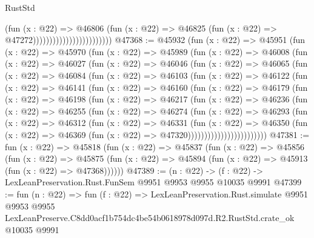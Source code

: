 \begin{lexlean}{RustStd}
\begin{coremodule}
                                              (fun (x : @22) =>
                                              @46806
                                                (fun (x : @22) =>
                                                @46825
                                                  (fun (x : @22) => @47272))))))))))))))))))))))))
@47368 := @45932
    (fun (x : @22) =>
    @45951
      (fun (x : @22) =>
      @45970
        (fun (x : @22) =>
        @45989
          (fun (x : @22) =>
          @46008
            (fun (x : @22) =>
            @46027
              (fun (x : @22) =>
              @46046
                (fun (x : @22) =>
                @46065
                  (fun (x : @22) =>
                  @46084
                    (fun (x : @22) =>
                    @46103
                      (fun (x : @22) =>
                      @46122
                        (fun (x : @22) =>
                        @46141
                          (fun (x : @22) =>
                          @46160
                            (fun (x : @22) =>
                            @46179
                              (fun (x : @22) =>
                              @46198
                                (fun (x : @22) =>
                                @46217
                                  (fun (x : @22) =>
                                  @46236
                                    (fun (x : @22) =>
                                    @46255
                                      (fun (x : @22) =>
                                      @46274
                                        (fun (x : @22) =>
                                        @46293
                                          (fun (x : @22) =>
                                          @46312
                                            (fun (x : @22) =>
                                            @46331
                                              (fun (x : @22) =>
                                              @46350
                                                (fun (x : @22) =>
                                                @46369
                                                  (fun (x : @22) => @47320))))))))))))))))))))))))
@47381 := fun (x : @22) =>
  @45818
    (fun (x : @22) =>
    @45837
      (fun (x : @22) =>
      @45856
        (fun (x : @22) =>
        @45875 (fun (x : @22) => @45894 (fun (x : @22) => @45913 (fun (x : @22) => @47368))))))
@47389 := (n : @22) -> (f : @22) -> LexLeanPreservation.Rust.FunSem @9951 @9953 @9955 @10035 @9991
@47399 := fun (n : @22) =>
  fun (f : @22) =>
  LexLeanPreservation.Rust.simulate
    @9951
    @9953
    @9955
    LexLeanPreserve.C8dd0acf1b754dc4be54b0618978d097d.R2.RustStd.crate_ok
    @10035
    @9991
\end{coremodule}
\end{lexlean}
